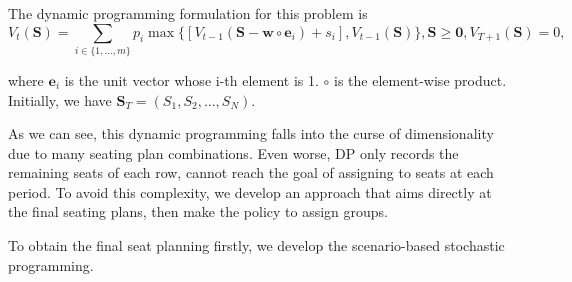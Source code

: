 The dynamic programming formulation for this problem is
$$V_{t}(\mathbf{S}) = \sum_{i \in \{1,\ldots,m\}} p_i \max\{ {[V_{t-1}(\mathbf{S}- \mathbf{w} \circ \mathbf{e}_{i})+ s_i]}, {V_{t-1}(\mathbf{S})}\}, \mathbf{S} \geq \mathbf{0}, V_{T+1}(\mathbf{S}) = 0,$$

where $\mathbf{e}_{i}$ is the unit vector whose i-th element is 1. $\circ$ is the element-wise product. Initially, we have $\mathbf{S}_{T} = (S_1, S_2, \ldots, S_{N})$. 

As we can see, this dynamic programming falls into the curse of dimensionality due to many seating plan combinations. Even worse, DP only records the remaining seats of each row, cannot reach the goal of assigning to seats at each period. To avoid this complexity, we develop an approach that aims directly at the final seating plans, then make the policy to assign groups. 










To obtain the final seat planning firstly, we develop the scenario-based stochastic programming.
